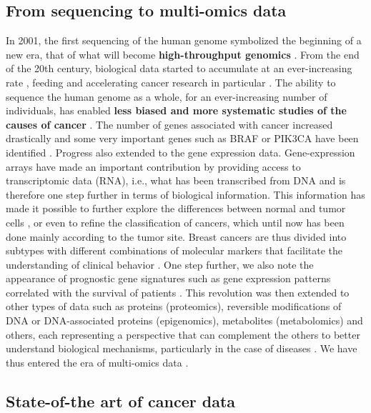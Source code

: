 \documentclass[a4paper,12pt,twoside,onecolumn,openright,final,oldfontcommands]{memoir}
\begin{document}
\subsection{From sequencing to multi-omics
data}\label{from-sequencing-to-multi-omics-data}

In 2001, the first sequencing of the human genome symbolized the
beginning of a new era, that of what will become \textbf{high-throughput
genomics} \citep{lander2001initial, venter2001sequence}. From the end of
the 20th century, biological data started to accumulate at an
ever-increasing rate \citep{reuter2015high}, feeding and accelerating
cancer research in particular
\citep{stratton2009cancer, meyerson2010advances}. The ability to
sequence the human genome as a whole, for an ever-increasing number of
individuals, has enabled \textbf{less biased and more systematic studies
of the causes of cancer} \citep{lander2011initial}. The number of genes
associated with cancer increased drastically and some very important
genes such as BRAF or PIK3CA have been identified
\citep{davies2002mutations, samuels2004high}. Progress also extended to
the gene expression data. Gene-expression arrays have made an important
contribution by providing access to transcriptomic data (RNA), i.e.,
what has been transcribed from DNA and is therefore one step further in
terms of biological information. This information has made it possible
to further explore the differences between normal and tumor cells
\citep{perou1999distinctive}, or even to refine the classification of
cancers, which until now has been done mainly according to the tumor
site. Breast cancers are thus divided into subtypes with different
combinations of molecular markers that facilitate the understanding of
clinical behavior \citep{perou2000molecular}. One step further, we also
note the appearance of prognostic gene signatures such as gene
expression patterns correlated with the survival of patients
\citep{van2002gene}. This revolution was then extended to other types of
data such as proteins (proteomics), reversible modifications of DNA or
DNA-associated proteins (epigenomics), metabolites (metabolomics) and
others, each representing a perspective that can complement the others
to better understand biological mechanisms, particularly in the case of
diseases \citep{hasin2017multi}. We have thus entered the era of
multi-omics data \citep{vucic2012translating}.

\subsection{State-of-the art of cancer
data}\label{state-of-the-art-of-cancer-data}
\end{document}
